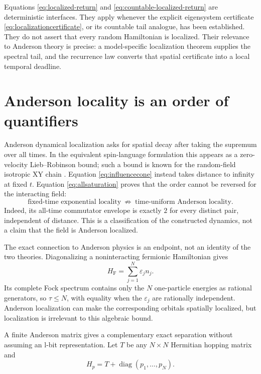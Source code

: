 \documentclass[10pt]{article}
\theoremstyle{definition}
\begin{document}
Equations \eqref{eq:localized-return} and
\eqref{eq:countable-localized-return} are deterministic interfaces. They
apply whenever the explicit eigensystem certificate
\eqref{eq:localizationcertificate}, or its countable tail analogue, has
been established. They do not assert that every random Hamiltonian is
localized. Their relevance to Anderson theory is precise: a
model-specific localization theorem supplies the spectral tail, and the
recurrence law converts that spatial certificate into a local temporal
deadline.

\section{Anderson locality is an order of quantifiers}

Anderson dynamical localization asks for spatial decay after taking the
supremum over all times. In the equivalent spin-language formulation this
appears as a zero-velocity Lieb--Robinson bound; such a bound is known for
the random-field isotropic XY chain
\cite{HamzaSimsStolz2012}. Equation \eqref{eq:influencecone} instead takes
distance to infinity at fixed \(t\). Equation \eqref{eq:allsaturation}
proves that the order cannot be reversed for the interacting field:
\begin{equation}
 \boxed{
 \text{fixed-time exponential locality}
 \ \not\Rightarrow\
 \text{time-uniform Anderson locality}.}
 \label{eq:quantifierseparation}
\end{equation}
Indeed, its all-time commutator envelope is exactly \(2\) for every
distinct pair, independent of distance. This is a classification of the
constructed dynamics, not a claim that the field is Anderson localized.

The exact connection to Anderson physics is an endpoint, not an identity of
the two theories. Diagonalizing a noninteracting fermionic Hamiltonian gives
\[
 H_{\mathrm F}=\sum_{j=1}^{N}\varepsilon_j n_j.
\]
Its complete Fock spectrum contains only the \(N\) one-particle energies as
rational generators, so \(\tau\le N\), with equality when the
\(\varepsilon_j\) are rationally independent. Anderson localization can
make the corresponding orbitals spatially localized, but localization is
irrelevant to this algebraic bound.

A finite Anderson matrix gives a complementary exact separation without
assuming an l-bit representation. Let \(T\) be any \(N\times N\) Hermitian
hopping matrix and
\[
H_p=T+\operatorname{diag}(p_1,\ldots,p_N).
\]
\end{document}
